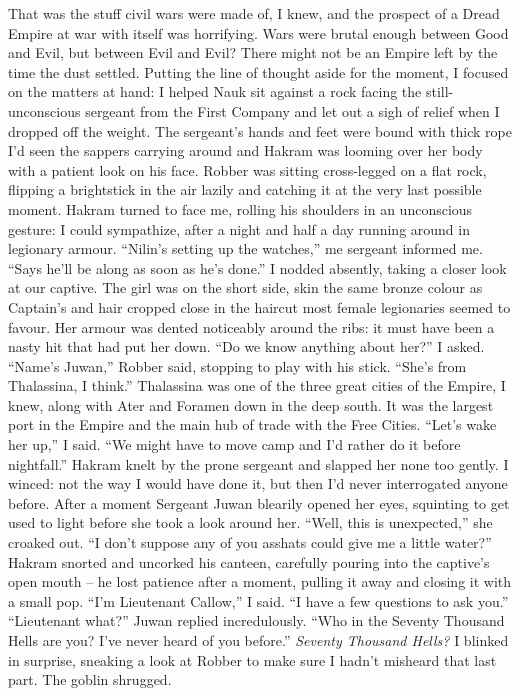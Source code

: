 \documentclass[12pt, openany]{book}
\begin{document}
That was the stuff civil wars were made of, I knew, and the prospect of a Dread Empire at war with itself was horrifying. Wars were brutal enough between Good and Evil, but between Evil and Evil? There might not be an Empire left by the time the dust settled. Putting the line of thought aside for the moment, I focused on the matters at hand: I helped Nauk sit against a rock facing the still-unconscious sergeant from the First Company and let out a sigh of relief when I dropped off the weight. The sergeant’s hands and feet were bound with thick rope I’d seen the sappers carrying around and Hakram was looming over her body with a patient look on his face. Robber was sitting cross-legged on a flat rock, flipping a brightstick in the air lazily and catching it at the very last possible moment. Hakram turned to face me, rolling his shoulders in an unconscious gesture: I could sympathize, after a night and half a day running around in legionary armour.
“Nilin’s setting up the watches,” me sergeant informed me. “Says he’ll be along as soon as he’s done.”
I nodded absently, taking a closer look at our captive. The girl was on the short side, skin the same bronze colour as Captain’s and hair cropped close in the haircut most female legionaries seemed to favour. Her armour was dented noticeably around the ribs: it must have been a nasty hit that had put her down.
“Do we know anything about her?” I asked.
“Name’s Juwan,” Robber said, stopping to play with his stick. “She’s from Thalassina, I think.”
Thalassina was one of the three great cities of the Empire, I knew, along with Ater and Foramen down in the deep south. It was the largest port in the Empire and the main hub of trade with the Free Cities.
“Let’s wake her up,” I said. “We might have to move camp and I’d rather do it before nightfall.”
Hakram knelt by the prone sergeant and slapped her none too gently. I winced: not the way I would have done it, but then I’d never interrogated anyone before. After a moment Sergeant Juwan blearily opened her eyes, squinting to get used to light before she took a look around her.
“Well, this is unexpected,” she croaked out. “I don’t suppose any of you asshats could give me a little water?”
Hakram snorted and uncorked his canteen, carefully pouring into the captive’s open mouth – he lost patience after a moment, pulling it away and closing it with a small pop.
“I’m Lieutenant Callow,” I said. “I have a few questions to ask you.”
“Lieutenant what?” Juwan replied incredulously. “Who in the Seventy Thousand Hells are you? I’ve never heard of you before.”
\textit{Seventy Thousand Hells?} I blinked in surprise, sneaking a look at Robber to make sure I hadn’t misheard that last part. The goblin shrugged.
\end{document}
